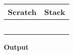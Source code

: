 \documentclass[12pt]{article}
\begin{document}

\thispagestyle{empty}

\noindent
\hspace{-0.7in}
  \begin{tabular}{| >{\centering\bfseries}p{2.2in} | >{\centering\arraybackslash\bfseries}p{3.8in} |}
    \hline
    Scratch & Stack \\
    \hline & \\[1in]
    \cline{2-2} & \\[1in]
    \cline{2-2} & \\[1in]
    \cline{2-2} & \\[1in]
    \cline{2-2} & \\[1in]
    \hline
  \end{tabular} \bigskip

  \noindent \textbf{Output}
\end{document}
